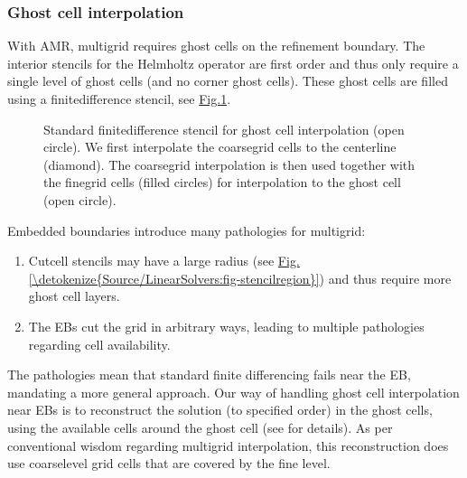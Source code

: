 \documentclass[letterpaper,10pt,english]{sphinxmanual}
\let\sphinxpxdimen\pdfpxdimen\else\newdimen\sphinxpxdimen
\begin{document}
\subsubsection{Ghost cell interpolation}
\label{\detokenize{Source/LinearSolvers:ghost-cell-interpolation}}\label{\detokenize{Source/LinearSolvers:chap-multigridinterpolation}}
With AMR, multigrid requires ghost cells on the refinement boundary.
The interior stencils for the Helmholtz operator are first order and thus only require a single level of ghost cells (and no corner ghost cells).
These ghost cells are filled using a finite\sphinxhyphen{}difference stencil, see \hyperref[\detokenize{Source/LinearSolvers:fig-multigridinterpolation}]{Fig.\@ \ref{\detokenize{Source/LinearSolvers:fig-multigridinterpolation}}}.

\begin{figure}[htb]
\centering
\capstart

\noindent\sphinxincludegraphics[width=360\sphinxpxdimen]{{MultigridInterpolation}.png}
\caption{Standard finite\sphinxhyphen{}difference stencil for ghost cell interpolation (open circle).
We first interpolate the coarse\sphinxhyphen{}grid cells to the centerline (diamond).
The coarse\sphinxhyphen{}grid interpolation is then used together with the fine\sphinxhyphen{}grid cells (filled circles) for interpolation to the ghost cell (open circle).}\label{\detokenize{Source/LinearSolvers:id4}}\label{\detokenize{Source/LinearSolvers:fig-multigridinterpolation}}\end{figure}

Embedded boundaries introduce many pathologies for multigrid:
\begin{enumerate}
%
\item {} 
Cut\sphinxhyphen{}cell stencils may have a large radius (see \hyperref[\detokenize{Source/LinearSolvers:fig-stencilregion}]{Fig.\@ \ref{\detokenize{Source/LinearSolvers:fig-stencilregion}}}) and thus require more ghost cell layers.

\item {} 
The EBs cut the grid in arbitrary ways, leading to multiple pathologies regarding cell availability.

\end{enumerate}

The pathologies mean that standard finite differencing fails near the EB, mandating a more general approach.
Our way of handling ghost cell interpolation near EBs is to reconstruct the solution (to specified order) in the ghost cells, using the available cells around the ghost cell (see {\hyperref[\detokenize{Utilities/LeastSquares:chap-leastsquares}]{}} for details).
As per conventional wisdom regarding multigrid interpolation, this reconstruction does  use coarse\sphinxhyphen{}level grid cells that are covered by the fine level.
\end{document}
